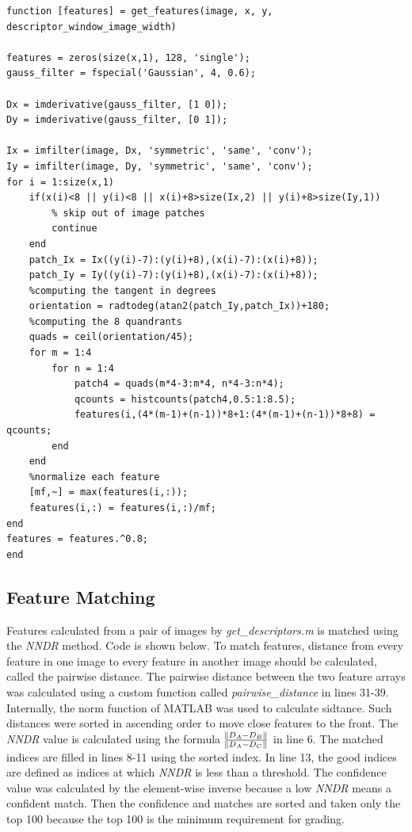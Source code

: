 \begin{lstlisting}[style=Matlab-editor]
function [features] = get_features(image, x, y, descriptor_window_image_width)

features = zeros(size(x,1), 128, 'single');
gauss_filter = fspecial('Gaussian', 4, 0.6);

Dx = imderivative(gauss_filter, [1 0]);
Dy = imderivative(gauss_filter, [0 1]);

Ix = imfilter(image, Dx, 'symmetric', 'same', 'conv');
Iy = imfilter(image, Dy, 'symmetric', 'same', 'conv');
for i = 1:size(x,1)
    if(x(i)<8 || y(i)<8 || x(i)+8>size(Ix,2) || y(i)+8>size(Iy,1))
        % skip out of image patches
        continue
    end
    patch_Ix = Ix((y(i)-7):(y(i)+8),(x(i)-7):(x(i)+8));
    patch_Iy = Iy((y(i)-7):(y(i)+8),(x(i)-7):(x(i)+8));
    %computing the tangent in degrees
    orientation = radtodeg(atan2(patch_Iy,patch_Ix))+180;
    %computing the 8 quandrants
    quads = ceil(orientation/45);
    for m = 1:4
        for n = 1:4
            patch4 = quads(m*4-3:m*4, n*4-3:n*4);
            qcounts = histcounts(patch4,0.5:1:8.5);
            features(i,(4*(m-1)+(n-1))*8+1:(4*(m-1)+(n-1))*8+8) = qcounts;
        end
    end
    %normalize each feature
    [mf,~] = max(features(i,:));
    features(i,:) = features(i,:)/mf;
end
features = features.^0.8;
end
\end{lstlisting}
\subsection{Feature Matching}
Features calculated from a pair of images by \emph{get\_descriptors.m} is matched using the \emph{NNDR} method. Code is shown below. To match features, distance from every feature in one image to every feature in another image should be calculated, called the pairwise distance. The pairwise distance between the two feature arrays was calculated using a custom function called \emph{pairwise\_distance} in lines 31-39. Internally, the norm function of MATLAB  was used to calculate sidtance. Such distances were sorted in ascending order to move close features to the front. The \emph{NNDR} value is calculated using the formula $\frac{\norm{D_A -D_B}}{\norm{D_A - D_C}}$ in line 6. The matched indices are filled in lines 8-11 using the sorted index. In line 13, the good indices are defined as indices at which \emph{NNDR} is less than a threshold. The confidence value was calculated by the element-wise inverse because a low \emph{NNDR} means a confident match. Then the confidence and matches are sorted and taken only the top 100 because the top 100 is the minimum requirement for grading.

